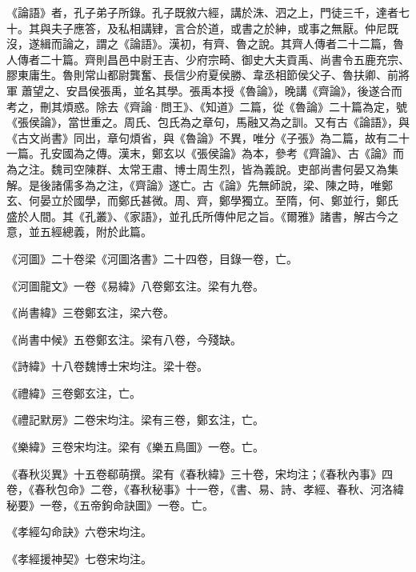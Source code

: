 \begin{pinyinscope}
 《論語》者，孔子弟子所錄。孔子既敘六經，講於洙、泗之上，門徒三千，達者七十。其與夫子應答，及私相講肄，言合於道，或書之於紳，或事之無厭。仲尼既沒，遂緝而論之，謂之《論語》。漢初，有齊、魯之說。其齊人傳者二十二篇，魯人傳者二十篇。齊則昌邑中尉王吉、少府宗畸、御史大夫貢禹、尚書令五鹿充宗、膠東庸生。魯則常山都尉龔奮、長信少府夏侯勝、韋丞相節侯父子、魯扶卿、前將軍
 蕭望之、安昌侯張禹，並名其學。張禹本授《魯論》，晚講《齊論》，後遂合而考之，刪其煩惑。除去《齊論·問王》、《知道》二篇，從《魯論》二十篇為定，號《張侯論》，當世重之。周氏、包氏為之章句，馬融又為之訓。又有古《論語》，與《古文尚書》同出，章句煩省，與《魯論》不異，唯分《子張》為二篇，故有二十一篇。孔安國為之傳。漢末，鄭玄以《張侯論》為本，參考《齊論》、古《論》而為之注。魏司空陳群、太常王肅、博士周生烈，皆為義說。吏部尚書何晏又為集解。是後諸儒多為之注，《齊論》遂亡。古《論》先無師說，梁、陳之時，唯鄭玄、何晏立於國學，而鄭氏甚微。周、齊，鄭學獨立。至隋，何、鄭並行，鄭氏
 盛於人間。其《孔叢》、《家語》，並孔氏所傳仲尼之旨。《爾雅》諸書，解古今之意，並五經總義，附於此篇。



 《河圖》二十卷梁《河圖洛書》二十四卷，目錄一卷，亡。



 《河圖龍文》一卷《易緯》八卷鄭玄注。梁有九卷。



 《尚書緯》三卷鄭玄注，梁六卷。



 《尚書中候》五卷鄭玄注。梁有八卷，今殘缺。



 《詩緯》十八卷魏博士宋均注。梁十卷。



 《禮緯》三卷鄭玄注，亡。



 《禮記默房》二卷宋均注。梁有三卷，鄭玄注，亡。



 《樂緯》三卷宋均注。梁有《樂五鳥圖》一卷。亡。



 《春秋災異》十五卷郗萌撰。梁有《春秋緯》三十卷，宋均注；《春秋內事》四卷，《春秋包命》二卷，《春秋秘事》十一卷，《書、易、詩、孝經、春秋、河洛緯秘要》一卷，《五帝鉤命訣圖》一卷。亡。



 《孝經勾命訣》六卷宋均注。



 《孝經援神契》七卷宋均注。




\end{pinyinscope}
